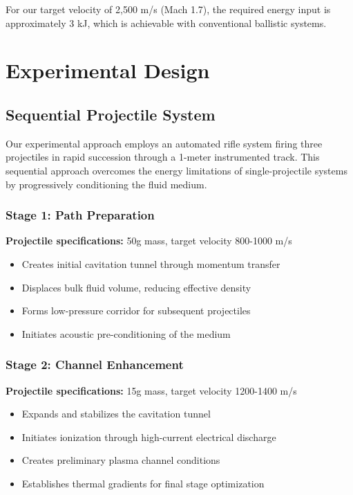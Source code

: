 \documentclass[12pt,a4paper]{article}
\begin{document}
For our target velocity of 2,500 m/s (Mach 1.7), the required energy input is approximately 3 kJ, which is achievable with conventional ballistic systems.

\section{Experimental Design}

\subsection{Sequential Projectile System}

Our experimental approach employs an automated rifle system firing three projectiles in rapid succession through a 1-meter instrumented track. This sequential approach overcomes the energy limitations of single-projectile systems by progressively conditioning the fluid medium.

\subsubsection{Stage 1: Path Preparation}
\textbf{Projectile specifications:} 50g mass, target velocity 800-1000 m/s
\begin{itemize}
\item Creates initial cavitation tunnel through momentum transfer
\item Displaces bulk fluid volume, reducing effective density
\item Forms low-pressure corridor for subsequent projectiles
\item Initiates acoustic pre-conditioning of the medium
\end{itemize}

\subsubsection{Stage 2: Channel Enhancement}
\textbf{Projectile specifications:} 15g mass, target velocity 1200-1400 m/s
\begin{itemize}
\item Expands and stabilizes the cavitation tunnel
\item Initiates ionization through high-current electrical discharge
\item Creates preliminary plasma channel conditions
\item Establishes thermal gradients for final stage optimization
\end{itemize}
\end{document}
